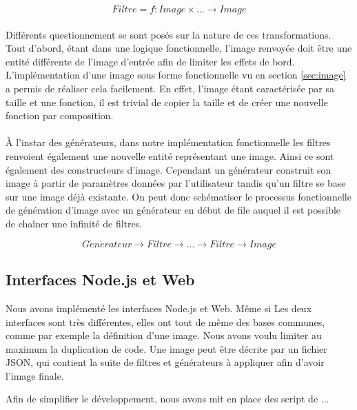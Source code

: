 \documentclass{article}
\begin{document}
\begin{equation*}
    Filtre = f : Image \times \dots \rightarrow Image
\end{equation*}

\paragraph{}
Différents questionnement se sont posés sur la nature de ces transformations. Tout d'abord, étant dans une logique fonctionnelle, l'image renvoyée doit être une entité différente de l'image d'entrée afin de limiter les effets de bord. L'implémentation d'une image sous forme fonctionnelle vu en section \ref{sec:image} a permis de réaliser cela facilement. En effet, l'image étant caractérisée par sa taille et une fonction, il est trivial de copier la taille et de créer une nouvelle fonction par composition.

\paragraph{}
À l'instar des générateurs, dans notre implémentation fonctionnelle les filtres renvoient également une nouvelle entité représentant une image. Ainsi ce sont également des constructeurs d'image. Cependant un générateur construit son image à partir de paramètres données par l'utilisateur tandis qu'un filtre se base sur une image déjà existante.
On peut donc schématiser le processus fonctionnelle de génération d'image avec un générateur en début de file auquel il est possible de chaîner une infinité de filtres.

\begin{equation*}
    G\acute{e}n\acute{e}rateur \rightarrow Filtre \rightarrow \dots \rightarrow Filtre \rightarrow Image
\end{equation*}

\subsection{Interfaces Node.js et Web}
Nous avons implémenté les interfaces Node.js et Web. Même si Les deux interfaces sont très différentes, elles ont tout de même des bases communes, comme par exemple la définition d'une image. Nous avons voulu limiter au maximum la duplication de code. Une image peut être décrite par un fichier JSON, qui contient la suite de filtres et générateurs à appliquer afin d'avoir l'image finale.

Afin de simplifier le développement, nous avons mit en place des script de ...
\end{document}
